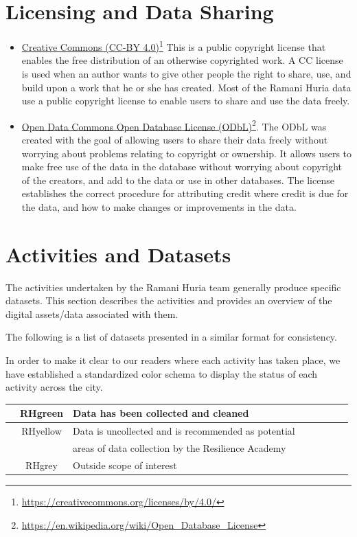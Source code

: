 \documentclass[a4paper,12pt,twoside]{article}
\begin{document}
\section{Licensing and Data Sharing}
\begin{itemize}
    \item
    \href{https://creativecommons.org/licenses/by/4.0/}{Creative Commons (CC-BY 4.0)}\footnote{\url{https://creativecommons.org/licenses/by/4.0/}}
This is a public copyright license that enables the free distribution of an otherwise copyrighted work. A CC license is used when an author wants to give other people the right to share, use, and build upon a work that he or she has created. Most of the Ramani Huria data use a public copyright license to enable users to share and use the data freely.

\item 
\href{https://en.wikipedia.org/wiki/Open_Database_License}{Open Data Commons Open Database License (ODbL)}\footnote{\url{https://en.wikipedia.org/wiki/Open_Database_License}}.
The ODbL was created with the goal of allowing users to share their data freely without worrying about problems relating to copyright or ownership. It allows users to make free use of the data in the database without worrying about copyright of the creators, and add to the data or use in other databases. The license establishes the correct procedure for attributing credit where credit is due for the data, and how to make changes or improvements in the data. 

\end{itemize}

\newpage
\section{Activities and Datasets}
The activities undertaken by the Ramani Huria team generally produce specific datasets. This section describes the activities and provides an overview of the digital assets/data associated with them.

The following is a list of datasets presented in a similar format for consistency.

In order to make it clear to our readers where each activity has taken place, we have established a standardized color schema to display the status of each activity across the city. 

\begin{tabular}{|l|c|l|c|l|c|l|c|}
\hline
{\colorbox{RHgreen}{   }} & RHgreen & Data has been collected and cleaned\\
\hline
{\colorbox{RHyellow}{   }} & RHyellow & Data is uncollected and is recommended as potential\\
{} & {} & areas of data collection by the Resilience Academy\\
\hline
{\colorbox{RHgrey}{   }} & RHgrey & Outside scope of interest\\
\hline
\end{tabular}
\end{document}
